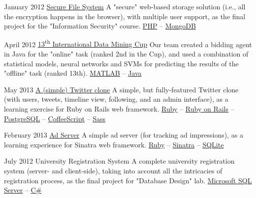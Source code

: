 \documentclass{tccv}
\begin{document}
\begin{project_list}
\item{January 2012}
	 {}
	 {\href{https://github.com/pooriaazimi/secure_file_system}{Secure File System}}
	 {A "secure" web-based storage solution (i.e., all the encryption happens in the browser), with multiple user support, as the final project for the "Information Security" course.}
	 {
		 \href{http://php.net}{PHP} -- 
		 \href{http://www.mongodb.org}{MongoDB}
	 }



\item{April 2012}
	 {}
	 {\href{http://www.data-mining-cup.de/en/review/dmc-2012/}{13\textsuperscript{th} International Data Mining Cup}}
	 {Our team created a bidding agent in Java for the "online" task (ranked 2nd in the Cup), and used a combination of statistical models, neural networks and SVMs for predicting the results of the "offline" task (ranked 13th).}
	 {
	 	\href{http://www.mathworks.com/products/matlab/}{MATLAB} -- 
	 	\href{http://www.oracle.com/technetwork/java/}{Java}
	 }



\item{May 2013}
	 {}
	 {\href{https://github.com/pooriaazimi/twitter}{A (simple) Twitter clone}}
	 {A simple, but fully-featured Twitter clone (with users, tweets, timeline view, following, and an admin interface), as a learning exercise for Ruby on Rails web framework.}
	 {
		 \href{https://www.ruby-lang.org/en/}{Ruby} -- 
		 \href{http://rubyonrails.org}{Ruby on Rails} -- 
		 \href{http://www.postgresql.org}{PostgreSQL} -- 
		 \href{http://coffeescript.org}{CoffeeScript} -- 
		 \href{http://sass-lang.com}{Sass}
	 }



\item{February 2013}
	 {}
	 {\href{https://github.com/pooriaazimi/adserver}{Ad Server}}
	 {A simple ad server (for tracking ad impressions), as a learning experience for Sinatra web framework.}
	 {
	 	\href{https://www.ruby-lang.org/en/}{Ruby} -- 
		\href{http://www.sinatrarb.com}{Sinatra} -- 
		\href{http://www.sqlite.org}{SQLite}
	 }



\item{July 2012}
	 {}
	 {University Registration System}
	 {A complete university registration system (server- and client-side), taking into account all the intricacies of registration process, as the final project for "Database Design" lab.}
	 {
	 	\href{http://www.microsoft.com/en-us/sqlserver/default.aspx}{Microsoft SQL Server} -- 
		\href{https://en.wikipedia.org/wiki/C_Sharp_(programming_language)}{C\#}
	 }
	 

\end{project_list}
\end{document}
